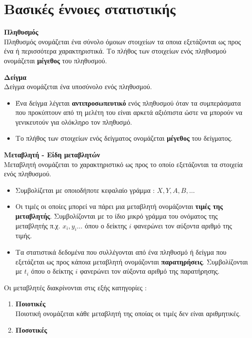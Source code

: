 \documentclass[twoside,nofonts,internet,math,spyros]{frontisthrio}
\begin{document}
\section{Βασικές έννοιες στατιστικής}
\orismoi
\begin{arithmisi}
\item \textbf{Πληθυσμός}\\
Πληθυσμός ονομάζεται ένα σύνολο όμοιων στοιχείων τα οποια εξετάζονται ως προς ένα ή περισσότερα χαρακτηριστικά. Το πλήθος των στοιχείων ενός πληθυσμού ονομάζεται \textbf{μέγεθος} του πληθυσμού.
\item\textbf{Δείγμα}\\
Δείγμα ονομάζεται ένα υποσύνολο ενός πληθυσμού. \begin{itemize}
\item Ένα δείγμα λέγεται \textbf{αντιπροσωπευτικό} ενός πληθυσμού όταν τα συμπεράσματα που προκύπτουν από τη μελέτη του είναι αρκετά αξιόπιστα ώστε να μπορούν να γενικευτούν για ολόκληρο τον πληθυσμό.
\item Το πλήθος των στοιχείων ενός δείγματος ονομάζεται \textbf{μέγεθος} του δείγματος.
\end{itemize}
\item\textbf{Μεταβλητή - Είδη μεταβλητών}\\
Μεταβλητή ονομάζεται το χαρακτηριστικό ως προς το οποίο εξετάζονται τα στοιχεία ενός πληθυσμού. 
\begin{itemize}
\item Συμβολίζεται με οποιοδήποτε κεφαλαίο γράμμα : $ X,Y,A,B,\ldots $
\item Οι τιμές οι οποίες μπορεί να πάρει μια μεταβλητή ονομάζονται \textbf{τιμές της μεταβλητής}. Συμβολίζονται με το ίδιο μικρό γράμμα του ονόματος της μεταβλητής π.χ. $ x_i,y_i\ldots $ όπου ο δείκτης $ i $ φανερώνει τον αύξοντα αριθμό της τιμής.
\item Τα στατιστικά δεδομένα που συλλέγονται από ένα πληθυσμό ή δείγμα που εξετάζεται ως προς κάποια μεταβλητή ονομάζονται \textbf{παρατηρήσεις}. Συμβολίζονται με $ t_i $ όπου ο δείκτης $ i $ φανερώνει τον αύξοντα αριθμό της παρατήρησης.
\end{itemize} 
Οι μεταβλητές διακρίνονται στις εξής κατηγορίες :
\begin{enumerate}[label=\bf\arabic*.]
\item \textbf{Ποιοτικές}\\
Ποιοτική ονομάζεται κάθε μεταβλητή της οποίας οι τιμές δεν είναι αριθμητικές.
\item \textbf{Ποσοτικές}\\

\end{enumerate}
\end{arithmisi}
\end{document}
